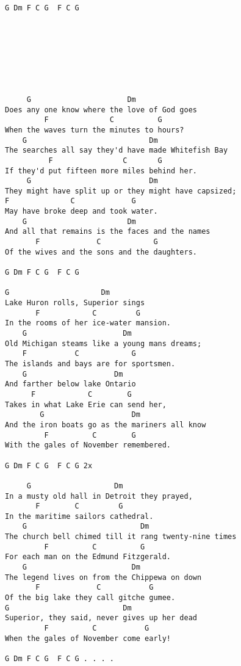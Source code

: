 \documentclass[leqno]{memoir}
\begin{document}
\begin{verbatim}
G Dm F C G  F C G








     G                      Dm
Does any one know where the love of God goes
         F              C          G
When the waves turn the minutes to hours? 
    G                            Dm
The searches all say they'd have made Whitefish Bay
          F                C       G
If they'd put fifteen more miles behind her.
     G                           Dm
They might have split up or they might have capsized;
F              C             G
May have broke deep and took water.
    G                       Dm
And all that remains is the faces and the names
       F             C            G
Of the wives and the sons and the daughters.

G Dm F C G  F C G

G                     Dm
Lake Huron rolls, Superior sings
       F            C         G
In the rooms of her ice-water mansion.
    G                      Dm
Old Michigan steams like a young mans dreams;
    F           C            G
The islands and bays are for sportsmen.
    G                    Dm
And farther below lake Ontario
      F            C        G
Takes in what Lake Erie can send her,
        G                    Dm
And the iron boats go as the mariners all know
         F          C        G
With the gales of November remembered.

G Dm F C G  F C G 2x

     G                   Dm
In a musty old hall in Detroit they prayed,
       F        C         G
In the maritime sailors cathedral.
    G                          Dm
The church bell chimed till it rang twenty-nine times
         F          C          G
For each man on the Edmund Fitzgerald.
    G                        Dm
The legend lives on from the Chippewa on down
       F             C           G
Of the big lake they call gitche gumee.
G                          Dm
Superior, they said, never gives up her dead
         F          C           G
When the gales of November come early!

G Dm F C G  F C G . . . .
\end{verbatim}
\newpage
\end{document}
